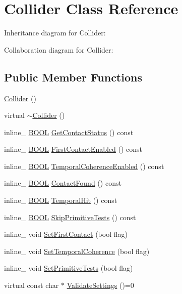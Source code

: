 \hypertarget{class_collider}{\section{Collider Class Reference}
\label{class_collider}
}


Inheritance diagram for Collider\+:


Collaboration diagram for Collider\+:
\subsection*{Public Member Functions}
\begin{DoxyCompactItemize}
\item 
\hyperlink{class_collider_aa7186870221f868bbc74c3ae8609fa66}{Collider} ()
\item 
virtual \hyperlink{class_collider_a564acde9860f875a32a6638c573d87be}{$\sim$\+Collider} ()
\item 
inline\+\_\+ \hyperlink{_ice_types_8h_a050c65e107f0c828f856a231f4b4e788}{B\+O\+O\+L} \hyperlink{class_collider_a64a73882d4f167a6175658f014868f66}{Get\+Contact\+Status} () const 
\item 
inline\+\_\+ \hyperlink{_ice_types_8h_a050c65e107f0c828f856a231f4b4e788}{B\+O\+O\+L} \hyperlink{class_collider_af57d7a211c40826fa86e6623dfc387a0}{First\+Contact\+Enabled} () const 
\item 
inline\+\_\+ \hyperlink{_ice_types_8h_a050c65e107f0c828f856a231f4b4e788}{B\+O\+O\+L} \hyperlink{class_collider_a94d86f6bd160dfbd02bd83e227f22047}{Temporal\+Coherence\+Enabled} () const 
\item 
inline\+\_\+ \hyperlink{_ice_types_8h_a050c65e107f0c828f856a231f4b4e788}{B\+O\+O\+L} \hyperlink{class_collider_a447787bced889e4a5843177f74f7e019}{Contact\+Found} () const 
\item 
inline\+\_\+ \hyperlink{_ice_types_8h_a050c65e107f0c828f856a231f4b4e788}{B\+O\+O\+L} \hyperlink{class_collider_a987693a9088b196d17a3af31190ed040}{Temporal\+Hit} () const 
\item 
inline\+\_\+ \hyperlink{_ice_types_8h_a050c65e107f0c828f856a231f4b4e788}{B\+O\+O\+L} \hyperlink{class_collider_a206226280dfadc656a7ead72542a9025}{Skip\+Primitive\+Tests} () const 
\item 
inline\+\_\+ void \hyperlink{class_collider_a106bfa35e6d203dfdb27a291b9fab01a}{Set\+First\+Contact} (bool flag)
\item 
inline\+\_\+ void \hyperlink{class_collider_a66fdf6157bf0159578723f3ed66f6e3f}{Set\+Temporal\+Coherence} (bool flag)
\item 
inline\+\_\+ void \hyperlink{class_collider_ad1c058ee059dc67a363dcad107742c07}{Set\+Primitive\+Tests} (bool flag)
\item 
virtual const char $\ast$ \hyperlink{class_collider_a225d4861b2184336433894174c6e3e2d}{Validate\+Settings} ()=0
\end{DoxyCompactItemize}

